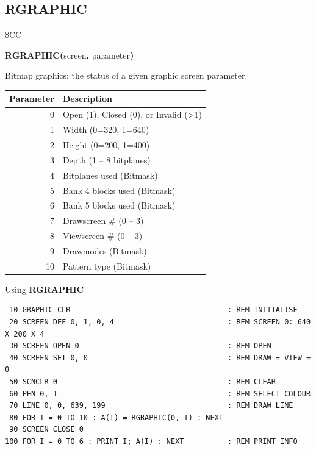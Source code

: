 \subsection{RGRAPHIC}
\begin{description}[leftmargin=2cm,style=nextline]
\item [Token:]    \$CC

\item [Format:]   {\bf RGRAPHIC(}screen{\bf,} parameter{\bf)}

\item [Returns:]  Bitmap graphics: the status of a given graphic screen parameter.

                  \begin{center}
                  {\setlength{\tabcolsep}{1mm}
                  \begin{tabular}{|r|l|}
                  \hline
                  {\bf Parameter} & {\bf Description} \\
                  \hline
                  0  & Open (1), Closed (0), or Invalid (>1) \\
                  1  & Width (0=320, 1=640) \\
                  2  & Height (0=200, 1=400) \\
                  3  & Depth (1 -- 8 bitplanes) \\
                  4  & Bitplanes used (Bitmask) \\
                  5  & Bank 4 blocks used (Bitmask) \\
                  6  & Bank 5 blocks used (Bitmask) \\
                  7  & Drawscreen \# (0 -- 3) \\
                  8  & Viewscreen \# (0 -- 3) \\
                  9  & Drawmodes (Bitmask) \\
                  10 & Pattern type (Bitmask) \\
                  \hline
                  \end{tabular}
                  }
                  \end{center}

\item [Example:]  Using {\bf RGRAPHIC}

\begin{tcolorbox}[colback=black,coltext=white]
\verbatimfont{\codefont}
\begin{verbatim}
 10 GRAPHIC CLR                                    : REM INITIALISE
 20 SCREEN DEF 0, 1, 0, 4                          : REM SCREEN 0: 640 X 200 X 4
 30 SCREEN OPEN 0                                  : REM OPEN
 40 SCREEN SET 0, 0                                : REM DRAW = VIEW = 0
 50 SCNCLR 0                                       : REM CLEAR
 60 PEN 0, 1                                       : REM SELECT COLOUR
 70 LINE 0, 0, 639, 199                            : REM DRAW LINE
 80 FOR I = 0 TO 10 : A(I) = RGRAPHIC(0, I) : NEXT
 90 SCREEN CLOSE 0
100 FOR I = 0 TO 6 : PRINT I; A(I) : NEXT          : REM PRINT INFO


\end{verbatim}
\end{tcolorbox}
\end{description}
